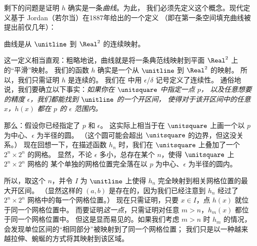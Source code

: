 \documentclass[../../../include/open-logic-section]{subfiles}
\begin{document}
剩下的问题是证明 $h$ 确实是一条\emph{曲线}。为此，
我们必须先定义这个概念。现代定义基于 Jordan（若尔当）在1887年给出的一个定义
（即在第一条空间填充曲线被提出前仅几年）：

\begin{defn}
曲线是从 $\unitline$ 到 $\Real^2$ 的连续映射。
\end{defn}

这一定义相当直观：粗略地说，曲线就是将一条典范线映射到平面 $\Real^2$ 上的“平滑”映射。
我们的函数 $h$ 确实是一个从 $\unitline$ 到 $\Real^2$ 的映射。
所以，我们只需证明 $h$ 是连续的。
我们在  中用 $\epsilon$/$\delta$ 记号定义了连续性。
通俗地说，我们要确立以下事实：\emph{如果你在 $\unitsquare$ 中指定一点 $p$，
以及任意想要的精度 $\epsilon$，我们都能找到 $\unitline$ 的一个开区间，
使得对于该开区间中的任意 $x$，$h(x)$ 都在 $p$ 的 $\epsilon$ 范围内。}

那么：假设你已经指定了 $p$ 和 $\epsilon$。
这实际上相当于在 $\unitsquare$ 上画一个以 $p$ 为中心、$\epsilon$ 为半径的圆。
（这个圆可能会超出 $\unitsquare$ 的边界，但这没关系。）
现在回想一下，在描述函数 $h_n$ 时，我们在 $\unitsquare$ 上叠加了一个 $2^n \times 2^n$ 的网格。
显然，不论 $\epsilon$ 多小，总存在某个 $n$，使得 $\unitsquare$ 上 $2^n \times 2^n$ 网格的
某个单独的网格位置完全落在以 $p$ 为中心、$\epsilon$ 为半径的圆内。

所以，取这个 $n$，并令 $I$ 为 $\unitline$ 上使得 $h_n$ 完全映射到相关网格位置的最大开区间。
（显然这样的 $(a,b)$ 是存在的，因为我们已经注意到 $h_n$ 经过了 $2^n\times 2^n$ 网格中的每一个网格位置。）
现在只需证明，只要 $x \in I$，点 $h(x)$ 就位于同一个网格位置中。
而要证明\emph{这一点}，只需证明对任意 $m > n$，$h_m(x)$ 都位于同一个网格位置中。
但这是显而易见的。如果我们考虑 $m > n$ 时 $h_m$ 的情况，
会发现单位区间的“相同部分”被映射到了同一个网格位置；
我们只是以一种越来越拉伸、蜿蜒的方式将其映射到该区域。
\end{document}
